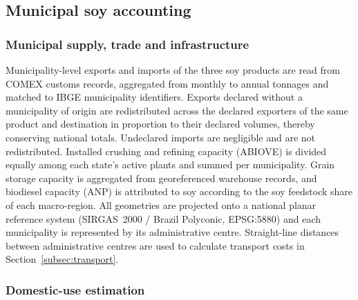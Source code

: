 \subsection{Municipal soy accounting}\label{subsec:accounting}

\subsubsection{Municipal supply, trade and infrastructure}\label{subsubsec:assemble}
Municipality-level exports and imports of the three soy products are read from COMEX customs records, aggregated from monthly to annual tonnages and matched to IBGE municipality identifiers. Exports declared without a municipality of origin are redistributed across the declared exporters of the same product and destination in proportion to their declared volumes, thereby conserving national totals. Undeclared imports are negligible and are not redistributed. Installed crushing and refining capacity (ABIOVE) is divided equally among each state's active plants and summed per municipality. Grain storage capacity is aggregated from georeferenced warehouse records, and biodiesel capacity (ANP) is attributed to soy according to the soy feedstock share of each macro-region. All geometries are projected onto a national planar reference system (SIRGAS~2000 / Brazil Polyconic, EPSG:5880) and each municipality is represented by its administrative centre. Straight-line distances between administrative centres are used to calculate transport costs in Section~\ref{subsec:transport}.

\subsubsection{Domestic-use estimation}\label{subsubsec:domuse}

